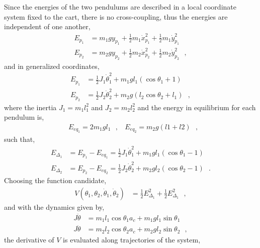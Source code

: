 Since the energies of the two pendulums are described in a local coordinate system fixed to the cart, there is no cross-coupling, thus the energies are independent of one another,
%
\begin{align}
  E_{p_1} &= m_1 g y_{p_1} + \tfrac{1}{2} m_1 \dot{x}_{p_1}^2 + \tfrac{1}{2} m_1 \dot{y}_{p_1}^2             \label{eq:pendulum1Energy} \\
  E_{p_2} &= m_2 g y_{p_2} + \tfrac{1}{2} m_2 \dot{x}_{p_2}^2 + \tfrac{1}{2} m_2 \dot{y}_{p_2}^2   \ \ \ ,   \label{eq:pendulum2Energy}
\end{align}
%
and in generalized coordinates,
\begin{align}
  E_{p_1} &= \tfrac{1}{2} J_1 \dot{\theta}_1^2 + m_1 g l_1 (\cos \theta_1 + 1)             \label{eq:pendulum1EnergyGeneralized} \\
  E_{p_2} &= \tfrac{1}{2} J_2 \dot{\theta}_2^2 + m_2 g (l_2 \cos \theta_2 + l_1) \ \ \ ,   \label{eq:pendulum2EnergyGeneralized}
\end{align}
%
where the inertia $J_1 = m_1 l_1^2$ and $J_2 = m_2 l_2^2$ and the energy in equilibrium for each pendulum is,
\begin{align}
  & E_{eq_1} = 2 m_1 g l_1 \ \ \ , \ \ \ \ E_{eq_2} = m_2 g (l1 + l2)   \ \ \ ,    \label{eq:eqEnergyTwin}
\end{align}
%
such that,
\begin{align}
  E_{\Delta_1} &= E_{p_1} - E_{eq_1} = \tfrac{1}{2} J_1 \dot{\theta}_1^2 + m_1 g l_1 (\cos \theta_1 - 1)             \label{eq:pendulum1EnergyError} \\
  E_{\Delta_2} &= E_{p_2} - E_{eq_2} =  \tfrac{1}{2} J_2 \dot{\theta}_2^2 + m_2 g l_2 (\cos \theta_2 - 1) \ \ \ .   \label{eq:pendulum2EnergyError}
\end{align}
%
Choosing the function candidate,
\begin{align}
  V(\theta_1, \theta_2, \dot{\theta}_1, \dot{\theta}_2) &= \tfrac{1}{2} E_{\Delta_1} ^2 + \tfrac{1}{2} E_{\Delta_1} ^2 \ \ \ ,   \label{eq:lyapunovCandidateTwin} 
\end{align}
%
and with the dynamics given by,
\begin{align}
  J \ddot{\theta} &= m_1 l_1 \cos \theta_1 a_c + m_1 g l_1 \sin \theta_1          \label{eq:pendulum1DynamicsTwin} \\
  J \ddot{\theta} &= m_2 l_2 \cos \theta_2 a_c + m_2 g l_2 \sin \theta_2 \ \ \ ,  \label{eq:pendulum2DynamicsTwin}
\end{align}
%
the derivative of $V$ is evaluated along trajectories of the system,
